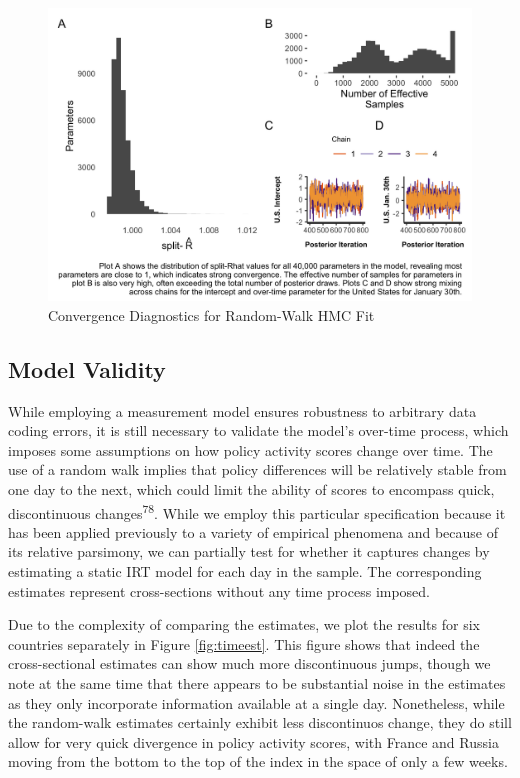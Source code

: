 \documentclass[]{article}
\begin{document}
\begin{figure}
\includegraphics[width=6.5in]{mcmc_evaluate} \caption{Convergence Diagnostics for Random-Walk HMC Fit}\label{fig:modelconv}
\end{figure}

\hypertarget{model-validity}{%
\subsection*{Model Validity}\label{model-validity}}

While employing a measurement model ensures robustness to arbitrary data coding errors, it is still necessary to validate the model's over-time process, which imposes some assumptions on how policy activity scores change over time. The use of a random walk implies that policy differences will be relatively stable from one day to the next, which could limit the ability of scores to encompass quick, discontinuous changes\textsuperscript{78}. While we employ this particular specification because it has been applied previously to a variety of empirical phenomena and because of its relative parsimony, we can partially test for whether it captures changes by estimating a static IRT model for each day in the sample. The corresponding estimates represent cross-sections without any time process imposed.

Due to the complexity of comparing the estimates, we plot the results for six countries separately in Figure \ref{fig:timeest}. This figure shows that indeed the cross-sectional estimates can show much more discontinuous jumps, though we note at the same time that there appears to be substantial noise in the estimates as they only incorporate information available at a single day. Nonetheless, while the random-walk estimates certainly exhibit less discontinuos change, they do still allow for very quick divergence in policy activity scores, with France and Russia moving from the bottom to the top of the index in the space of only a few weeks.
\end{document}
